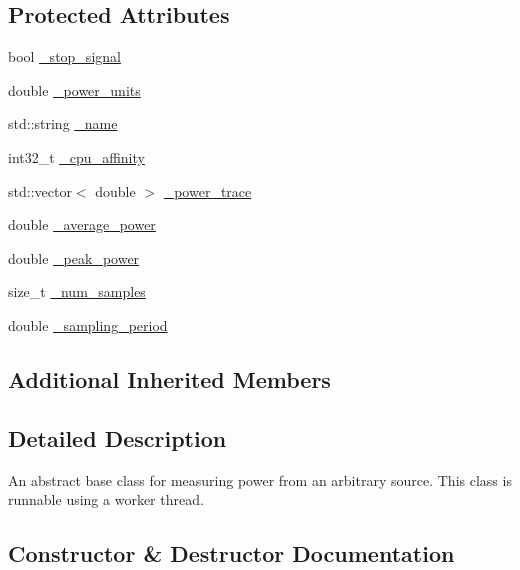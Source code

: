 \subsection*{Protected Attributes}
\begin{DoxyCompactItemize}
\item 
bool \hyperlink{classxmem_1_1power_1_1_power_reader_a1c0c890279f3f2b7eb41ab3e5889bf2e}{\+\_\+stop\+\_\+signal}
\item 
double \hyperlink{classxmem_1_1power_1_1_power_reader_a2835c933bd4807d6b3133a521dd76641}{\+\_\+power\+\_\+units}
\item 
std\+::string \hyperlink{classxmem_1_1power_1_1_power_reader_a85791da354d03c0a0f7ca4cf38b89e4c}{\+\_\+name}
\item 
int32\+\_\+t \hyperlink{classxmem_1_1power_1_1_power_reader_a0f95e6c4e8caa6db8de3fcf78509e887}{\+\_\+cpu\+\_\+affinity}
\item 
std\+::vector$<$ double $>$ \hyperlink{classxmem_1_1power_1_1_power_reader_ac8ad4bada42912ece1cbb0769dbe3b4d}{\+\_\+power\+\_\+trace}
\item 
double \hyperlink{classxmem_1_1power_1_1_power_reader_a1ad637b79a21519c20f9dda64fc1b908}{\+\_\+average\+\_\+power}
\item 
double \hyperlink{classxmem_1_1power_1_1_power_reader_a0bfe4f56c143f3febb404d85558e45fa}{\+\_\+peak\+\_\+power}
\item 
size\+\_\+t \hyperlink{classxmem_1_1power_1_1_power_reader_a296a8d15083e01e33590cbcd836aa07b}{\+\_\+num\+\_\+samples}
\item 
double \hyperlink{classxmem_1_1power_1_1_power_reader_a1c7d9b505d3c94347c43437a568e5948}{\+\_\+sampling\+\_\+period}
\end{DoxyCompactItemize}
\subsection*{Additional Inherited Members}


\subsection{Detailed Description}
An abstract base class for measuring power from an arbitrary source. This class is runnable using a worker thread. 

\subsection{Constructor \& Destructor Documentation}
\hypertarget{classxmem_1_1power_1_1_power_reader_abae158275e32689c1c69a90b8962959b}{}
